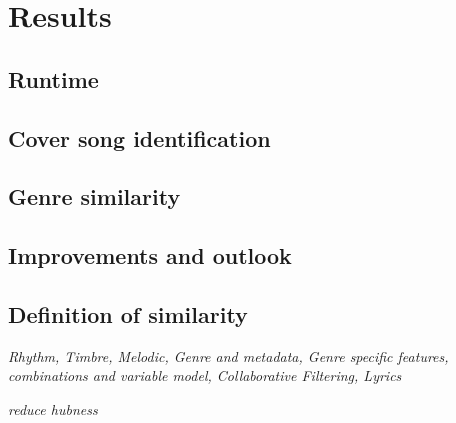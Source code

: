 
\chapter{Results}\label{bds2}

\section{Runtime}

\section{Cover song identification}

\section{Genre similarity}

\section{Improvements and outlook}

\section{Definition of similarity}
\textit{Rhythm, Timbre, Melodic, Genre and metadata, Genre specific features, combinations and variable model, Collaborative Filtering, Lyrics}

\textit{reduce hubness}

